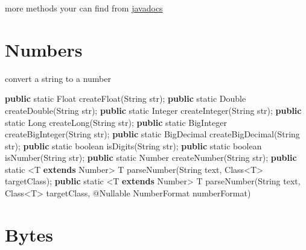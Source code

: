 \documentclass[
]{book}
\newenvironment{Shaded}{\begin{snugshade}}{\end{snugshade}}
\newcommand{\AttributeTok}[1]{\textcolor[rgb]{0.77,0.63,0.00}{#1}}
\newcommand{\BuiltInTok}[1]{#1}
\newcommand{\DataTypeTok}[1]{\textcolor[rgb]{0.13,0.29,0.53}{#1}}
\newcommand{\FunctionTok}[1]{\textcolor[rgb]{0.00,0.00,0.00}{#1}}
\newcommand{\KeywordTok}[1]{\textcolor[rgb]{0.13,0.29,0.53}{\textbf{#1}}}
\newcommand{\NormalTok}[1]{#1}
\begin{document}
more methods your can find from \href{https://apidoc.gitee.com/fangjinuo/langx-java}{javadocs}

\hypertarget{langx-java_references_utils_Numbers}{%
\section{Numbers}\label{langx-java_references_utils_Numbers}}

convert a string to a number

\begin{Shaded}
\begin{Highlighting}[]
\KeywordTok{public} \DataTypeTok{static} \BuiltInTok{Float} \FunctionTok{createFloat}\NormalTok{(}\BuiltInTok{String}\NormalTok{ str);}
\KeywordTok{public} \DataTypeTok{static} \BuiltInTok{Double} \FunctionTok{createDouble}\NormalTok{(}\BuiltInTok{String}\NormalTok{ str);}
\KeywordTok{public} \DataTypeTok{static} \BuiltInTok{Integer} \FunctionTok{createInteger}\NormalTok{(}\BuiltInTok{String}\NormalTok{ str);}
\KeywordTok{public} \DataTypeTok{static} \BuiltInTok{Long} \FunctionTok{createLong}\NormalTok{(}\BuiltInTok{String}\NormalTok{ str);}
\KeywordTok{public} \DataTypeTok{static} \BuiltInTok{BigInteger} \FunctionTok{createBigInteger}\NormalTok{(}\BuiltInTok{String}\NormalTok{ str);}
\KeywordTok{public} \DataTypeTok{static} \BuiltInTok{BigDecimal} \FunctionTok{createBigDecimal}\NormalTok{(}\BuiltInTok{String}\NormalTok{ str);}
\KeywordTok{public} \DataTypeTok{static} \DataTypeTok{boolean} \FunctionTok{isDigits}\NormalTok{(}\BuiltInTok{String}\NormalTok{ str);}
\KeywordTok{public} \DataTypeTok{static} \DataTypeTok{boolean} \FunctionTok{isNumber}\NormalTok{(}\BuiltInTok{String}\NormalTok{ str);}
\KeywordTok{public} \DataTypeTok{static} \BuiltInTok{Number} \FunctionTok{createNumber}\NormalTok{(}\BuiltInTok{String}\NormalTok{ str);}
\KeywordTok{public} \DataTypeTok{static}\NormalTok{ <T }\KeywordTok{extends} \BuiltInTok{Number}\NormalTok{> T }\FunctionTok{parseNumber}\NormalTok{(}\BuiltInTok{String}\NormalTok{ text, }\BuiltInTok{Class}\NormalTok{<T> targetClass);}
\KeywordTok{public} \DataTypeTok{static}\NormalTok{ <T }\KeywordTok{extends} \BuiltInTok{Number}\NormalTok{> T }\FunctionTok{parseNumber}\NormalTok{(}\BuiltInTok{String}\NormalTok{ text, }\BuiltInTok{Class}\NormalTok{<T> targetClass, }\AttributeTok{@Nullable} \BuiltInTok{NumberFormat}\NormalTok{ numberFormat)}
\end{Highlighting}
\end{Shaded}

\hypertarget{langx-java_references_utils_Bytes}{%
\section{Bytes}\label{langx-java_references_utils_Bytes}}
\end{document}
